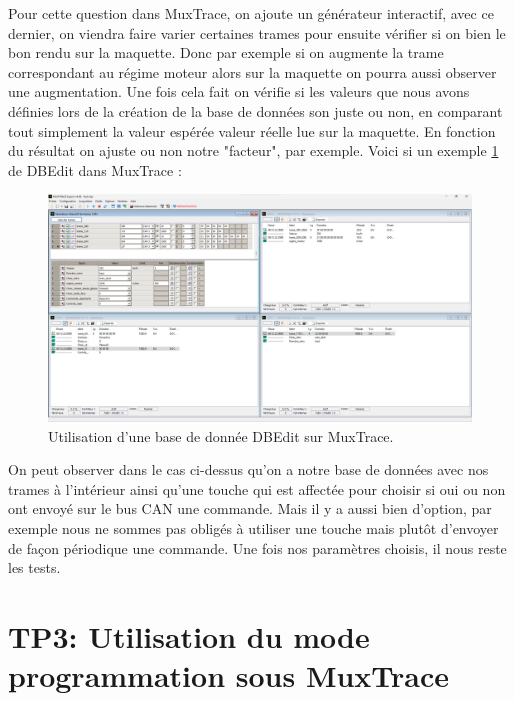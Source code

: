 \documentclass{rapportECC}
\begin{document}
Pour cette question dans MuxTrace, on ajoute un générateur interactif, avec ce dernier, on viendra faire varier certaines trames pour ensuite vérifier si on bien le bon rendu sur la maquette.
Donc par exemple si on augmente la trame correspondant au régime moteur alors sur la maquette on pourra aussi observer une augmentation.
Une fois cela fait on vérifie si les valeurs que nous avons définies lors de la création de la base de données son juste ou non, en comparant tout simplement la valeur espérée  valeur réelle lue sur la maquette.
En fonction du résultat on ajuste ou non notre "facteur", par exemple.
Voici si un exemple \ref{fig:DB_MuxTrace} de DBEdit dans MuxTrace : 

\begin{figure}[H]
    \centering
    \includegraphics[width=.9\textwidth]{./images/MUXTRACE_with_DB.png}
    \caption{Utilisation d'une base de donnée DBEdit sur MuxTrace.}
    \label{fig:DB_MuxTrace}
\end{figure}


On peut observer dans le cas ci-dessus qu'on a notre base de données avec nos trames à l'intérieur ainsi qu'une touche qui est affectée pour choisir si oui ou non ont envoyé sur le bus CAN une commande.
Mais il y a aussi bien d'option, par exemple nous ne sommes pas obligés à utiliser une touche mais plutôt d'envoyer de façon périodique une commande.
Une fois nos paramètres choisis, il nous reste les tests.


\section{TP3: Utilisation du mode programmation sous MuxTrace}
\end{document}
